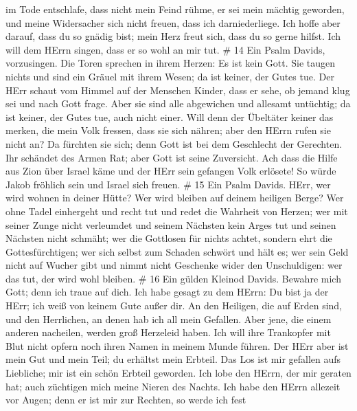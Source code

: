 im Tode entschlafe,  dass nicht mein Feind rühme, er sei
mein mächtig geworden, und meine Widersacher sich nicht freuen, dass ich
darniederliege.  Ich hoffe aber darauf, dass du so gnädig
bist; mein Herz freut sich, dass du so gerne hilfst.  Ich
will dem HErrn singen, dass er so wohl an mir tut. \# 14 
Ein Psalm Davids, vorzusingen. Die Toren sprechen in ihrem Herzen: Es
ist kein Gott. Sie taugen nichts und sind ein Gräuel mit ihrem Wesen; da
ist keiner, der Gutes tue.  Der HErr schaut vom Himmel auf
der Menschen Kinder, dass er sehe, ob jemand klug sei und nach Gott
frage.  Aber sie sind alle abgewichen und allesamt
untüchtig; da ist keiner, der Gutes tue, auch nicht einer. 
Will denn der Übeltäter keiner das merken, die mein Volk fressen, dass
sie sich nähren; aber den HErrn rufen sie nicht an?  Da
fürchten sie sich; denn Gott ist bei dem Geschlecht der Gerechten.
 Ihr schändet des Armen Rat; aber Gott ist seine Zuversicht.
 Ach dass die Hilfe aus Zion über Israel käme und der HErr
sein gefangen Volk erlösete! So würde Jakob fröhlich sein und Israel
sich freuen. \# 15  Ein Psalm Davids. HErr, wer wird wohnen
in deiner Hütte? Wer wird bleiben auf deinem heiligen Berge?
 Wer ohne Tadel einhergeht und recht tut und redet die
Wahrheit von Herzen;  wer mit seiner Zunge nicht verleumdet
und seinem Nächsten kein Arges tut und seinen Nächsten nicht schmäht;
 wer die Gottlosen für nichts achtet, sondern ehrt die
Gottesfürchtigen; wer sich selbst zum Schaden schwört und hält es;
 wer sein Geld nicht auf Wucher gibt und nimmt nicht
Geschenke wider den Unschuldigen: wer das tut, der wird wohl bleiben. \#
16  Ein gülden Kleinod Davids. Bewahre mich Gott; denn ich
traue auf dich.  Ich habe gesagt zu dem HErrn: Du bist ja
der HErr; ich weiß von keinem Gute außer dir.  An den
Heiligen, die auf Erden sind, und den Herrlichen, an denen hab ich all
mein Gefallen.  Aber jene, die einem anderen nacheilen,
werden groß Herzeleid haben. Ich will ihre Trankopfer mit Blut nicht
opfern noch ihren Namen in meinem Munde führen.  Der HErr
aber ist mein Gut und mein Teil; du erhältst mein Erbteil. 
Das Los ist mir gefallen aufs Liebliche; mir ist ein schön Erbteil
geworden.  Ich lobe den HErrn, der mir geraten hat; auch
züchtigen mich meine Nieren des Nachts.  Ich habe den HErrn
allezeit vor Augen; denn er ist mir zur Rechten, so werde ich fest
